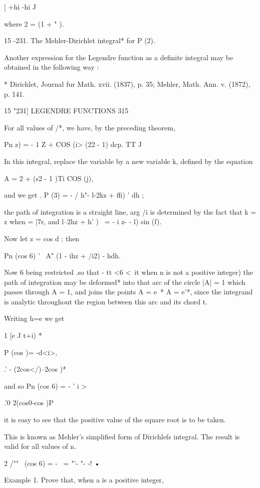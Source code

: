 {{[ +hi -hi J

where 2 = (1 + " ).

15 -231. The Mehler-Dirichlet integral* for P (2).

Another expression for the Legendre function as a definite integral
may be obtained in the following way :

* Dirichlet, Journal fur Math. xvii. (1837), p. 35; Mehler, Math. Ann.
v. (1872), p. 141.



15 "231] LEGENDRE FUNCTIONS 315

For all values of /*, we have, by the preceding theorem,

Pn z) = - 1 Z + COS (i> (22 - 1) dcp. TT J

In this integral, replace the variable by a new variable k, defined by
the equation

A = 2 + (s2 - 1 )Ti COS (j),

and we get . P (3) = - / h"- l-2kz + ffi) ' dh ;

the path of integration is a straight line, arg /i is determined by
the fact that k = z when = |7r, and l--2hz + h' )~ = - i z- - l) sin
(f).

Now let z = cos d ; then

Pn (cos 6) ' \ A" (1 - ihz + /i2) - hdh.

Now 6 being restricted .so that - tt <6 <\ it when n is not a positive
integer) the path of integration may be deformed* into that arc of the
circle |A| = 1 which passes through A = 1, and joins the points A =
e~* A = e'*, since the integrand is analytic throughout the region
between this arc and its chord t.

Writing h=e we get

1 [e J t+i) *

P (cos )= -d<i>,

  .' - (2cos</)--2cos )*

and so Pn (cos 6) = - ' i >

 .'0 2(cos0-cos )P

it is easy to see that the positive value of the square root is to be
taken.

This is known as Mehler's simplified form of Dirichlefs integral. The
result is valid for all values of n.



2 /"" \ (cos 6) = - \ = "'- "- -! •



Example 1. Prove that, when a is a positive integer,

}}
